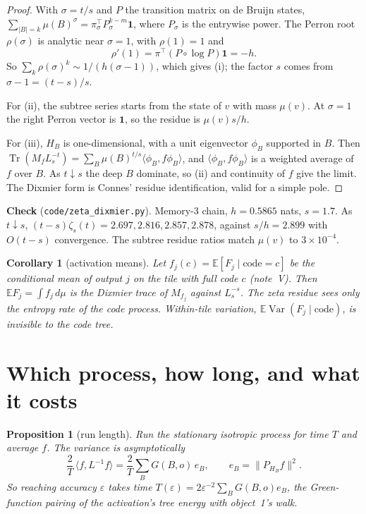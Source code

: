 \documentclass[11pt]{article}
\newtheorem{proposition}[theorem]{Proposition}
\newtheorem{corollary}[theorem]{Corollary}
\theoremstyle{definition}
\theoremstyle{remark}
\newcommand{\E}{\mathbb E}
\newcommand{\Var}{\operatorname{Var}}
\newcommand{\Tr}{\operatorname{Tr}}
\begin{document}
\begin{proof}
With $\sigma=t/s$ and $P$ the transition matrix on de Bruijn states, $\sum_{|B|=k}\mu(B)^\sigma=\pi_\sigma^\top P_\sigma^{k-m}\mathbf 1$, where $P_\sigma$ is the entrywise power. The Perron root $\rho(\sigma)$ is analytic near $\sigma=1$, with $\rho(1)=1$ and
\[\rho'(1)=\pi^\top(P\circ\log P)\mathbf 1=-h.\]
So $\sum_k\rho(\sigma)^k\sim1/(h(\sigma-1))$, which gives (i); the factor $s$ comes from $\sigma-1=(t-s)/s$.

For (ii), the subtree series starts from the state of $v$ with mass $\mu(v)$. At $\sigma=1$ the right Perron vector is $\mathbf 1$, so the residue is $\mu(v)s/h$.

For (iii), $H_B$ is one-dimensional, with a unit eigenvector $\phi_B$ supported in $B$. Then $\Tr(M_fL_s^{-t})=\sum_B\mu(B)^{t/s}\langle\phi_B,f\phi_B\rangle$, and $\langle\phi_B,f\phi_B\rangle$ is a weighted average of $f$ over $B$. As $t\downarrow s$ the deep $B$ dominate, so (ii) and continuity of $f$ give the limit. The Dixmier form is Connes' residue identification, valid for a simple pole.
\end{proof}

\textbf{Check} (\texttt{code/zeta\_dixmier.py}). Memory-$3$ chain, $h=0.5865$ nats, $s=1.7$. As $t\downarrow s$, $(t-s)\zeta_s(t)=2.697,2.816,2.857,2.878$, against $s/h=2.899$ with $O(t-s)$ convergence. The subtree residue ratios match $\mu(v)$ to $3\times10^{-4}$.

\begin{corollary}[activation means]
Let $f_j(c)=\E[F_j\mid\text{code}=c]$ be the conditional mean of output $j$ on the tile with full code $c$ (note~V). Then $\E F_j=\int f_j\,d\mu$ is the Dixmier trace of $M_{f_j}$ against $L_s^{-s}$. The zeta residue sees only the entropy rate of the code process. Within-tile variation, $\E\Var(F_j\mid\text{code})$, is invisible to the code tree.
\end{corollary}

\section{Which process, how long, and what it costs}

\begin{proposition}[run length]\label{prop:run}
Run the stationary isotropic process for time $T$ and average $f$. The variance is asymptotically
\[\frac2T\,\langle f,L^{-1}f\rangle=\frac2T\sum_BG(B,o)\,e_B,\qquad e_B=\|P_{H_B}f\|^2.\]
So reaching accuracy $\varepsilon$ takes time $T(\varepsilon)=2\varepsilon^{-2}\sum_BG(B,o)e_B$, the Green-function pairing of the activation's tree energy with object~1's walk.
\end{proposition}
\end{document}

